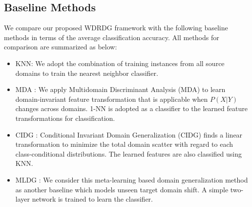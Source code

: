 \documentclass[journal]{IEEEtran}
\begin{document}

\subsection{Baseline Methods}
We compare our proposed WDRDG framework with the following baseline methods in terms of the average classification accuracy.
All methods for comparison are summarized as below:
\begin{itemize}
    \item {KNN:} We adopt the combination of training instances from all source domains to train the nearest neighbor classifier.
    \item {MDA \cite{hu2020domain}:} We apply Multidomain Discriminant Analysis (MDA) to learn domain-invariant feature transformation
    that is applicable when $P(X|Y)$ changes across domains.
    1-NN is adopted as a classifier to the learned feature transformations for classification.
    \item {CIDG \cite{li2018domain2}:} Conditional Invariant Domain Generalization (CIDG) finds a linear transformation to minimize the total domain scatter with regard to each class-conditional distributions. The learned features are also classified using KNN.
    \item {MLDG \cite{li2018learning}}: We consider this meta-learning based domain generalization method as another baseline which models unseen target domain shift. 
    A simple two-layer network is trained to learn the classifier.
    
\end{itemize}
\end{document}
